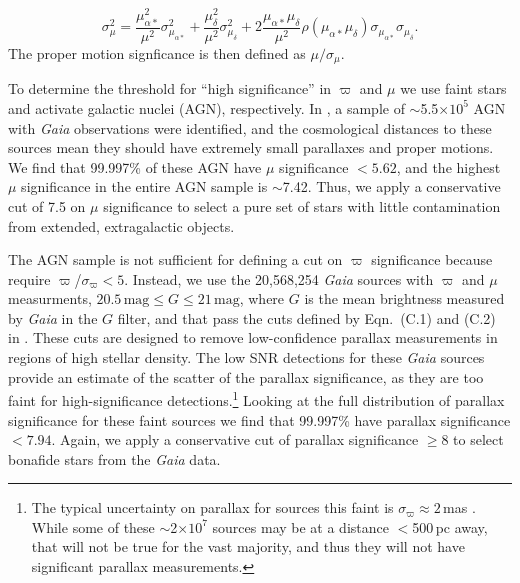 \documentclass[twocolumn]{aastex62}
\begin{document}
\begin{CJK*}{UTF8}{gbsn}
%
$$ \sigma_\mu^2 = \frac{\mu_{\alpha\ast}^2}{\mu^2}\sigma_{\mu_{\alpha\ast}}^2 +
\frac{\mu_{\delta}^2}{\mu^2}\sigma_{\mu_{\delta}}^2 +
2\frac{\mu_{\alpha\ast}\mu_{\delta}}{\mu^2} \rho(\mu_{\alpha\ast}\mu_{\delta})
\sigma_{\mu_{\alpha\ast}}\sigma_{\mu_{\delta}}.$$
%
The proper motion signficance is then defined as $\mu/\sigma_\mu$.

To determine the threshold for ``high significance'' in $\varpi$ and $\mu$
we use faint stars and activate galactic nuclei (AGN), respectively. In
\citet{Lindegren18}, a sample of $\sim$5.5$\times10^{5}$ AGN with
\textit{Gaia} observations were identified, and the cosmological distances
to these sources mean they should have extremely small parallaxes and proper
motions. We find that 99.997\% of these AGN have $\mu$ significance $<
5.62$, and the highest $\mu$ significance in the entire AGN sample is
$\sim$7.42. Thus, we apply a conservative cut of 7.5 on $\mu$ significance
to select a pure set of stars with little contamination from extended,
extragalactic objects.

The AGN sample is not sufficient for defining a cut on $\varpi$ significance
because \citet{Lindegren18} require $\varpi$/$\sigma_\varpi < 5$. Instead,
we use the 20,568,254 \textit{Gaia} sources with $\varpi$ and $\mu$
measurments, $20.5\,\mathrm{mag} \le G \le 21\,\mathrm{mag}$, where $G$ is
the mean brightness measured by \textit{Gaia} in the $G$ filter, and that
pass the cuts defined by Eqn.~(C.1) and (C.2) in \citet{Lindegren18}. These
cuts are designed to remove low-confidence parallax measurements in regions
of high stellar density. The low SNR detections for these \textit{Gaia}
sources provide an estimate of the scatter of the parallax significance, as
they are too faint for high-significance detections.\footnote{The typical
uncertainty on parallax for sources this faint is $\sigma_\varpi \approx
2$\,mas \citep{Lindegren18}. While some of these $\sim$2$\times10^7$ sources
may be at a distance $<$500\,pc away, that will not be true for the vast
majority, and thus they will not have significant parallax measurements.}
Looking at the full distribution of parallax significance for these faint
sources we find that 99.997\% have parallax significance $< 7.94$. Again, we
apply a conservative cut of parallax significance $\ge$8 to select bonafide
stars from the \textit{Gaia} data.


\end{CJK*}
\end{document}
